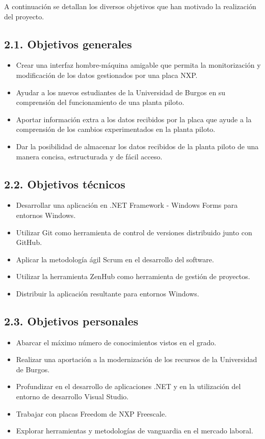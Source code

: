 
A continuación se detallan los diversos objetivos que han motivado la realización del proyecto.

\subsection{2.1. Objetivos generales}

\begin{itemize}
	\item Crear una interfaz hombre-máquina amigable que permita la monitorización y modificación de los datos gestionados por una placa NXP.
	\item Ayudar a los nuevos estudiantes de la Universidad de Burgos en su comprensión del funcionamiento de una planta piloto.
	\item Aportar información extra a los datos recibidos por la placa que ayude a la comprensión de los cambios experimentados en la planta piloto.
	\item Dar la posibilidad de almacenar los datos recibidos de la planta piloto de una manera concisa, estructurada y de fácil acceso.
\end{itemize}

\subsection{2.2. Objetivos técnicos}

\begin{itemize}
	\item Desarrollar una aplicación en .NET Framework - Windows Forms para entornos Windows.
	\item Utilizar Git como herramienta de control de versiones distribuido junto con GitHub.
	\item Aplicar la metodología ágil Scrum en el desarrollo del software.
	\item Utilizar la herramienta ZenHub como herramienta de gestión de proyectos.
	\item Distribuir la aplicación resultante para entornos Windows.
\end{itemize}

\subsection{2.3. Objetivos personales}

\begin{itemize}
	\item Abarcar el máximo número de conocimientos vistos en el grado.
	\item Realizar una aportación a la modernización de los recursos de la Universidad de Burgos.
	\item Profundizar en el desarrollo de aplicaciones .NET y en la utilización del entorno de desarrollo Visual Studio.
	\item Trabajar con placas Freedom de NXP Freescale.
	\item Explorar herramientas y metodologías de vanguardia en el mercado laboral.
\end{itemize}